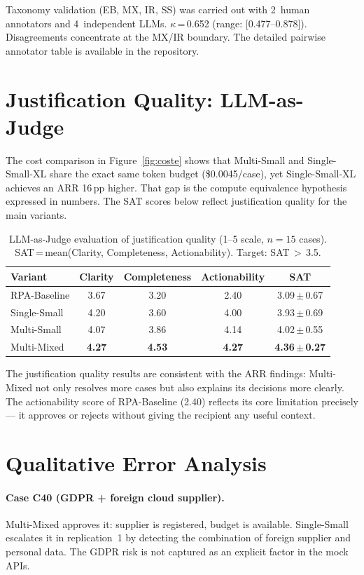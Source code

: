 \documentclass[preprint,12pt,numrefs]{elsarticle}
\begin{document}
Taxonomy validation (EB, MX, IR, SS) was carried out with 2~human
annotators and 4~independent LLMs. $\kappa$\,=\,0.652 (range:
[0.477--0.878]). Disagreements concentrate at the MX/IR boundary. The
detailed pairwise annotator table is available in the repository.

\section{Justification Quality: LLM-as-Judge}
\label{app:sat}
The cost comparison in Figure~\ref{fig:coste} shows that Multi-Small
and Single-Small-XL share the exact same token budget (\$0.0045/case),
yet Single-Small-XL achieves an ARR 16\,pp higher. That gap is the
compute equivalence hypothesis expressed in numbers. The SAT scores
below reflect justification quality for the main variants.

\begin{table}[H]
\centering
\caption{LLM-as-Judge evaluation of justification quality (1--5 scale,
         $n=15$ cases). SAT\,=\,mean(Clarity, Completeness,
         Actionability). Target: SAT\,$>$\,3.5.}
\label{tab:sat}
\begin{tabular}{lcccc}
\toprule
\textbf{Variant} & \textbf{Clarity} & \textbf{Completeness} &
  \textbf{Actionability} & \textbf{SAT} \\
\midrule
RPA-Baseline & 3.67 & 3.20 & 2.40 & 3.09\,$\pm$\,0.67 \\
Single-Small & 4.20 & 3.60 & 4.00 & 3.93\,$\pm$\,0.69 \\
Multi-Small  & 4.07 & 3.86 & 4.14 & 4.02\,$\pm$\,0.55 \\
Multi-Mixed  & \textbf{4.27} & \textbf{4.53} & \textbf{4.27} & \textbf{4.36\,$\pm$\,0.27} \\
\bottomrule
\end{tabular}
\end{table}

The justification quality results are consistent with the ARR findings:
Multi-Mixed not only resolves more cases but also explains its decisions
more clearly. The actionability score of RPA-Baseline (2.40) reflects
its core limitation precisely --- it approves or rejects without giving
the recipient any useful context.

\section{Qualitative Error Analysis}
\label{app:errors}

\paragraph{Case C40 (GDPR + foreign cloud supplier).}
Multi-Mixed approves it: supplier is registered, budget is available.
Single-Small escalates it in replication~1 by detecting the combination
of foreign supplier and personal data. The GDPR risk is not captured as
an explicit factor in the mock APIs.
\end{document}
